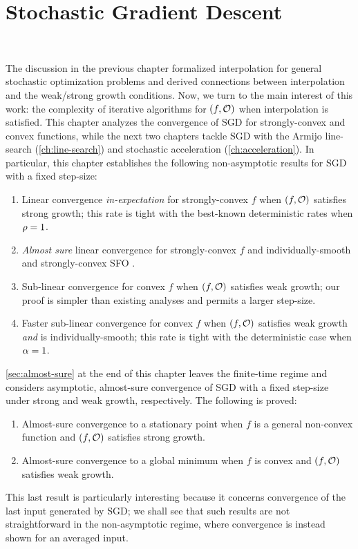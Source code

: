 
\chapter{Stochastic Gradient Descent}~\label{ch:sgd}

The discussion in the previous chapter formalized interpolation for general stochastic optimization problems and derived connections between interpolation and the weak/strong growth conditions.  
Now, we turn to the main interest of this work: the complexity of iterative algorithms for \( \rbr{f, \oracle{}} \) when interpolation is satisfied. 
This chapter analyzes the convergence of \ac{SGD} for strongly-convex and convex functions, while the next two chapters tackle \ac{SGD} with the Armijo line-search (\autoref{ch:line-search}) and stochastic acceleration (\autoref{ch:acceleration}).
In particular, this chapter establishes the following non-asymptotic results for \ac{SGD} with a fixed step-size: 
\begin{enumerate}
    \item Linear convergence \emph{in-expectation} for strongly-convex \( f \) when \( \rbr{f, \oracle{}} \) satisfies strong growth; this rate is tight with the best-known deterministic rates when \( \sgc = 1 \).
    \item \emph{Almost sure} linear convergence for strongly-convex \( f \) and individually-smooth and strongly-convex \ac{SFO} \oracle{}. 
    \item Sub-linear convergence for convex \( f \) when \( \rbr{f, \oracle{}} \) satisfies weak growth; our proof is simpler than existing analyses and permits a larger step-size.
    \item Faster sub-linear convergence for convex \( f \) when \( \rbr{f, \oracle{}} \) satisfies weak growth \emph{and} \oracle{} is individually-smooth; this rate is tight with the deterministic case when \( \wgc = 1 \).
\end{enumerate}
\autoref{sec:almost-sure} at the end of this chapter leaves the finite-time regime and considers asymptotic, almost-sure convergence of \ac{SGD} with a fixed step-size under strong and weak growth, respectively.
The following is proved: 
\begin{enumerate}
    \item Almost-sure convergence to a stationary point when \( f \) is a general non-convex function and \( \rbr{f, \oracle{}} \) satisfies strong growth.
    \item Almost-sure convergence to a global minimum when \( f \) is convex and \( \rbr{f, \oracle{}} \) satisfies weak growth.
\end{enumerate}
This last result is particularly interesting because it concerns convergence of the last input generated by \ac{SGD};
we shall see that such results are not straightforward in the non-asymptotic regime, where convergence is instead shown for an averaged input. 

